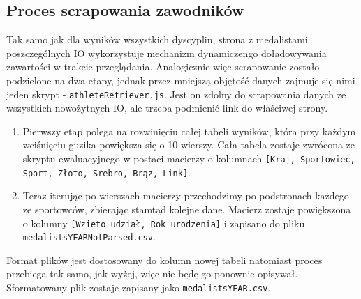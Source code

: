 \documentclass[a4paper,11pt]{article}
\begin{document}
\subsection{Proces scrapowania zawodników}
    Tak samo jak dla wyników wszystkich dyscyplin, strona z medalistami
    poszczególnych IO wykorzystuje mechanizm dynamiczengo doładowywania zawartości
    w trakcie przeglądania. Analogicznie więc scrapowanie zostało podzielone na
    dwa etapy, jednak przez mniejszą objętość danych zajmuje się nimi jeden skrypt
    - \verb|athleteRetriever.js|. Jest on zdolny do scrapowania danych ze
    wszystkich nowożytnych IO, ale trzeba podmienić link do właściwej strony.
    \begin{enumerate}
        \item Pierwszy etap polega na rozwinięciu całej tabeli wyników, która 
        przy każdym wciśnięciu guzika powiększa się o 10 wierszy. Cała tabela
        zostaje zwrócona ze skryptu ewaluacyjnego w postaci macierzy o kolumnach
        \verb|[Kraj, Sportowiec, Sport, Złoto, Srebro, Brąz, Link]|.
        \item Teraz iterując po wierszach macierzy przechodzimy po podstronach
        każdego ze sportowców, zbierając stamtąd kolejne dane. Macierz zostaje
        powiększona o kolumny \verb|[Wzięto udział, Rok urodzenia]| i zapisano
        do pliku \verb|medalistsYEARNotParsed.csv|.
    \end{enumerate}
    Format plików jest dostosowany do kolumn nowej tabeli natomiast proces 
    przebiega tak samo, jak wyżej, więc nie będę go ponownie opisywał. Sformatowany
    plik zostaje zapisany jako \verb|medalistsYEAR.csv|.
\end{document}
